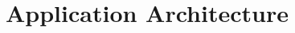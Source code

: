 \documentclass[../main.tex]{subfiles}
\begin{document}
\chapter{Application Architecture}


\end{document}
